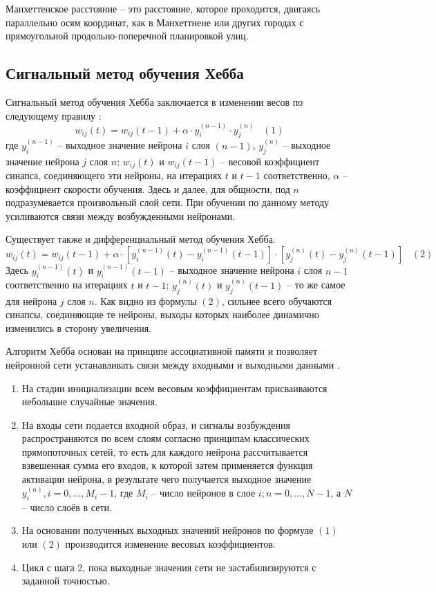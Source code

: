 \documentclass[bachelor, och, referat]{SCWorks}
\begin{document}
Манхеттенское расстояние -- это расстояние, которое проходится,
двигаясь параллельно осям координат, как в Манхеттнене или других
городах с прямоугольной продольно-поперечной планировкой улиц. 

\subsection{Сигнальный метод обучения Хебба}
Сигнальный метод обучения Хебба заключается в изменении весов по следующему
правилу \cite{hebb1}:
\[ w_{ij}(t) = w_{ij}(t - 1) + \alpha \cdot y_i^{(n - 1)} \cdot y_j^{(n)} \; \; \; (1)\]
где $y_i^{(n - 1)}$ -- выходное значение нейрона $i$ слоя 
$(n - 1)$, $y_j^{(n)}$ -- выходное значение нейрона $j$ слоя $n$;
$w_{ij}(t)$ и $w_{ij}(t - 1)$ -- весовой коэффициент синапса, 
соединяющего эти нейроны, на итерациях $t$ и $t - 1$ соответственно,
$\alpha$ -- коэффициент скорости обучения. Здесь и далее, для
общности, под $n$ подразумевается произвольный слой сети. 
При обучении по данному методу усиливаются связи между возбужденными нейронами. 

Существует также и дифференциальный метод обучения Хебба.
\[ w_{ij}(t) = w_{ij}(t - 1) + \alpha \cdot [y_i^{(n-1)}(t) - 
y_i^{(n - 1)}(t - 1)] \cdot [y_j^{(n)}(t) - y_j^{(n)}(t - 1)] \; \; \; (2)\]
Здесь $y_i^{(n-1)}(t)$ и $y_i^{(n - 1)}(t - 1)$ -- выходное
значение нейрона $i$ слоя $n - 1$ соответственно на итерациях
$t$ и $t - 1$; $y_j^{(n)}(t)$ и $y_j^{(n)}(t - 1)$ -- то же самое
для нейрона $j$ слоя $n$. Как видно из формулы $(2)$,
сильнее всего обучаются синапсы, соединяющие те нейроны,
выходы которых наиболее динамично изменились в сторону увеличения.

Алгоритм Хебба основан на принципе ассоциативной памяти и позволяет нейронной сети устанавливать связи между входными и выходными данными \cite{hebb2}.
\begin{enumerate}
    \item На стадии инициализации всем весовым коэффициентам присваиваются небольшие
    случайные значения.
    \item На входы сети подается входной образ, и сигналы возбуждения распространяются по
    всем слоям согласно принципам классических прямопоточных сетей, 
    то есть для каждого нейрона рассчитывается взвешенная сумма его входов, 
    к которой затем применяется функция активации нейрона, в результате
    чего получается выходное значение $y_i^{(n)}, i = 0, \dots, M_i - 1$,
    где $M_i$ -- число нейронов в слое $i; n = 0, \dots, N - 1$, а $N$
    -- число слоёв в сети.
    \item На основании полученных выходных значений нейронов по формуле $(1)$ или $(2)$
    производится изменение весовых коэффициентов. 
    \item Цикл с шага 2, пока выходные значения сети не застабилизируются с заданной точностью.
\end{enumerate}
\end{document}
